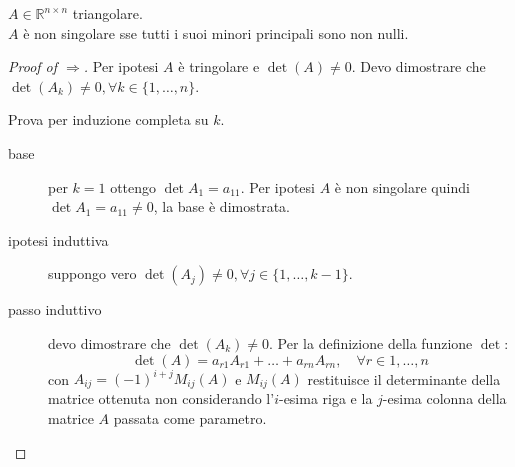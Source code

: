 \begin{exercise}[3.5, Lemma 3.2]
$A \in \mathbb{R}^{n \times n}$ triangolare. \\
$A$ \`e non singolare sse tutti i suoi
minori principali sono non nulli. 
\end{exercise}
\begin{proof}[Proof of $\Rightarrow$]
Per ipotesi $A$ \`e tringolare e $\det(A) \not = 0$.
Devo dimostrare che $\det(A_{k}) \not = 0, \forall k \in \lbrace 1,\ldots, n
\rbrace$.

Prova per induzione completa su $k$.
\begin{description}
\item[base] per $k = 1$ ottengo $\det{A_{1}} = a_{11}$. Per ipotesi $A$ \`e
non singolare quindi $\det{A_{1}} = a_{11} \not = 0$, la base \`e dimostrata.
\item[ipotesi induttiva] suppongo vero $\det(A_{j}) \not = 0, \forall j \in
\lbrace 1,\ldots, k-1 \rbrace$.
\item[passo induttivo] devo dimostrare che $\det(A_{k}) \not = 0$.
Per la definizione della funzione $\det$:
\begin{displaymath}
\det(A) = a_{r1}A_{r1} + \ldots + a_{rn}A_{rn}, \quad \forall r \in {1,\ldots,n}
\end{displaymath}
con $A_{ij} = (-1)^{i+j}M_{ij}(A)$ e $M_{ij}(A)$ restituisce il determinante
della matrice ottenuta non considerando l'$i$-esima riga e la $j$-esima colonna
della matrice $A$ passata come parametro.
\end{description}


\end{proof}
